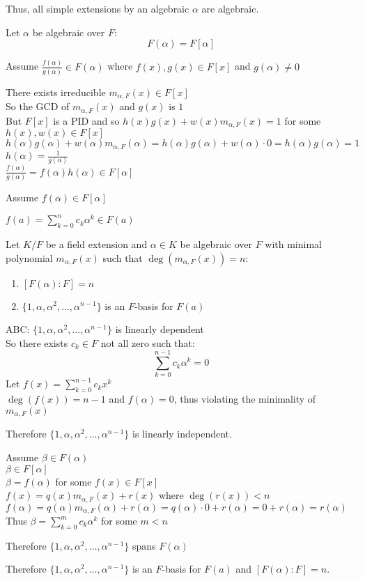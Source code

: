 \documentclass[letterpaper,12pt,fleqn]{article}
\renewcommand{\a}{\alpha}
\renewcommand{\b}{\beta}
\begin{document}
Thus, all simple extensions by an algebraic $\a$ are algebraic.

\begin{theorem}
  Let $\a$ be algebraic over $F$:
  \[F(\a)=F[\a]\]
\end{theorem}

\begin{theproof}
  \listbreak
  \begin{description}
  \item Assume $\frac{f(\a)}{g(\a)}\in F(\a)$ where $f(x),g(x)\in F[x]$ and $g(\a)\ne0$

    There exists irreducible $m_{\a,F}(x)\in F[x]$ \\
    So the GCD of $m_{\a,F}(x)$ and $g(x)$ is $1$ \\
    But $F[x]$ is a PID and so $h(x)g(x)+w(x)m_{\a,F}(x)=1$ for some
    $h(x),w(x)\in F[x]$ \\
    $h(\a)g(\a)+w(\a)m_{\a,F}(\a)=h(\a)g(\a)+w(\a)\cdot0=h(\a)g(\a)=1$ \\
    $h(\a)=\frac{1}{g(\a)}$ \\
    $\frac{f(\a)}{g(\a)}=f(\a)h(\a)\in F[\a]$

  \item Assume $f(\a)\in F[\a]$

    $f(a)=\sum_{k=0}^nc_k\a^k\in F(a)$
  \end{description}
\end{theproof}
\newpage
\begin{theorem}
  Let $K/F$ be a field extension and $\a\in K$ be algebraic over $F$ with minimal
  polynomial $m_{\a,F}(x)$ such that $\deg(m_{\a,F}(x))=n$:
  \begin{enumerate}
  \item $[F(\a):F]=n$
  \item $\{1,\a,\a^2,\ldots,\a^{n-1}\}$ is an $F$-basis for $F(a)$
  \end{enumerate}
\end{theorem}

\begin{theproof}
  ABC: $\{1,\a,\a^2,\ldots,\a^{n-1}\}$ is linearly dependent \\
  So there exists $c_k\in F$ not all zero such that:
  \[\sum_{k=0}^{n-1}c_k\a^k=0\]
  Let $f(x)=\sum_{k=0}^{n-1}c_kx^k$ \\
  $\deg(f(x))=n-1$ and $f(\a)=0$, thus violating the minimality of $m_{\a,F}(x)$

  Therefore $\{1,\a,\a^2,\ldots,\a^{n-1}\}$ is linearly independent.

  Assume $\b\in F(\a)$ \\
  $\b\in F[\a]$ \\
  $\b=f(\a)$ for some $f(x)\in F[x]$ \\
  $f(x)=q(x)m_{\a,F}(x)+r(x)$ where $\deg(r(x))<n$ \\
  $f(\a)=q(\a)m_{\a,F}(\a)+r(\a)=q(\a)\cdot0+r(\a)=0+r(\a)=r(\a)$ \\
  Thus $\b=\sum_{k=0}^mc_k\a^k$ for some $m<n$

  Therefore $\{1,\a,\a^2,\ldots,\a^{n-1}\}$ spans $F(\a)$

  Therefore $\{1,\a,\a^2,\ldots,\a^{n-1}\}$ is an $F$-basis for $F(a)$ and
  $[F(\a):F]=n$.
\end{theproof}
\end{document}
